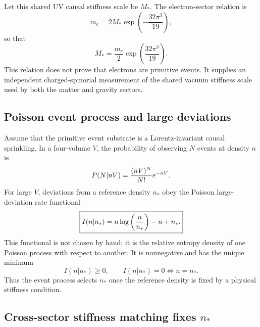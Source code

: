 \documentclass[11pt]{article}
\begin{document}
Let this shared UV causal stiffness scale be $M_*$. The electron-sector relation is
\begin{equation}
 m_e=2M_*\exp\left(-\frac{32\pi^3}{19}\right),
\end{equation}
so that
\begin{equation}
M_*=\frac{m_e}{2}\exp\left(\frac{32\pi^3}{19}\right).
\end{equation}
This relation does not prove that electrons are primitive events. It supplies an independent charged-spinorial measurement of the shared vacuum stiffness scale used by both the matter and gravity sectors.

\subsection{Poisson event process and large deviations}

Assume that the primitive event substrate is a Lorentz-invariant causal sprinkling. In a four-volume $V$, the probability of observing $N$ events at density $n$ is
\begin{equation}
P(N|nV)={ (nV)^N\over N!}e^{-nV}.
\end{equation}
For large $V$, deviations from a reference density $n_*$ obey the Poisson large-deviation rate functional
\begin{equation}
\boxed{I(n|n_*)=n\log\left({n\over n_*}\right)-n+n_*.}
\end{equation}
This functional is not chosen by hand; it is the relative entropy density of one Poisson process with respect to another. It is nonnegative and has the unique minimum
\begin{equation}
I(n|n_*)\ge0,
\qquad
I(n|n_*)=0\iff n=n_*.
\end{equation}
Thus the event process selects $n_*$ once the reference density is fixed by a physical stiffness condition.

\subsection{Cross-sector stiffness matching fixes $n_*$}
\end{document}
